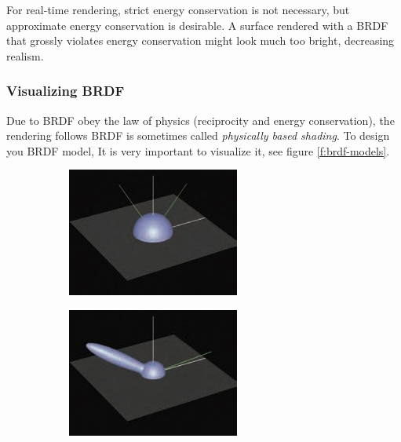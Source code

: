 For real-time rendering, strict energy conservation is not necessary, but approximate energy conservation is desirable. A surface rendered with a BRDF that grossly violates energy conservation might look much too bright, decreasing realism.


\subsubsection{Visualizing BRDF}
Due to BRDF obey the law of physics (reciprocity and energy conservation), the rendering follows BRDF is sometimes called \textit{physically based shading}. To design you BRDF model, It is very important to visualize it, see figure \ref{f:brdf-models}.

\begin{figure}\label{f:brdf-models}
\begin{center}
	\begin{subfigure}[b]{0.325\textwidth}
		\includegraphics[width=1.\textwidth]{graphics/gi/ray-optics-8-1}
	\end{subfigure}
	\begin{subfigure}[b]{0.325\textwidth}
		\includegraphics[width=1.\textwidth]{graphics/gi/ray-optics-8-2}

\end{subfigure}
\end{center}
\end{figure}
